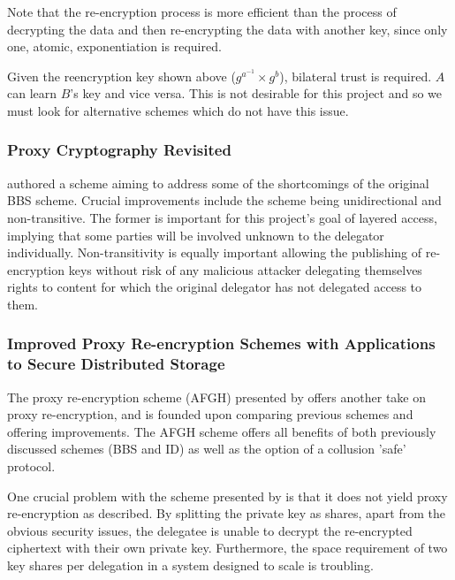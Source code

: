 Note that the re-encryption process is more efficient than the process of decrypting the data and then re-encrypting the data with another key, since only one, atomic, exponentiation is required.

Given the reencryption key shown above ($g^{a^{-1}} \times g^{b}$), bilateral trust is required. $A$ can learn $B$'s key and vice versa. This is not desirable for this project and so we must look for alternative schemes which do not have this issue.

\subsubsection{Proxy Cryptography Revisited}

\cite{ivandodis:2003:inproceedings} authored a scheme aiming to address some of the shortcomings of the original BBS scheme. Crucial improvements include the scheme being unidirectional and non-transitive. The former is important for this project's goal of layered access, implying that some parties will be involved unknown to the delegator individually. Non-transitivity is equally important allowing the publishing of re-encryption keys without risk of any malicious attacker delegating themselves rights to content for which the original delegator has not delegated access to them.


\subsubsection{Improved Proxy Re-encryption Schemes with Applications to Secure Distributed Storage}

The proxy re-encryption scheme (AFGH) presented by \cite{afgh:2006:article} offers another take on proxy re-encryption, and is founded upon comparing previous schemes and offering improvements. The AFGH scheme offers all benefits of both previously discussed schemes (BBS and ID) as well as the option of a collusion 'safe' protocol.

One crucial problem with the scheme presented by \cite{ivandodis:2003:inproceedings} is that it does not yield proxy re-encryption as described. By splitting the private key as shares, apart from the obvious security issues, the delegatee is unable to decrypt the re-encrypted ciphertext with their own private key. Furthermore, the space requirement of two key shares per delegation in a system designed to scale is troubling.

